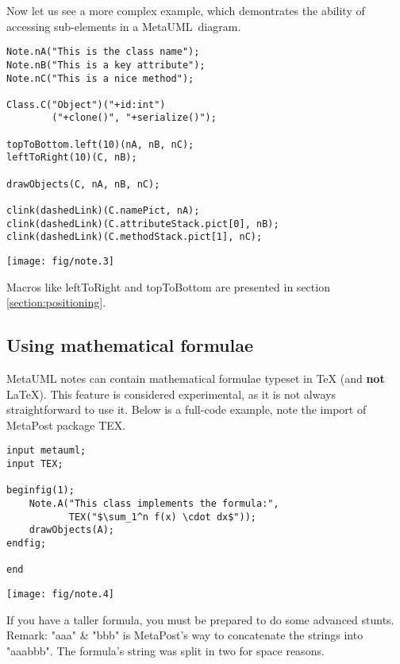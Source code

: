 \documentclass{article}
\newcommand{\code}{\ttfamily}
\newcommand{\metauml}{MetaUML}
\begin{document}
Now let us see a more complex example, which demontrates the ability of accessing sub-elements in a \metauml\ diagram.
\pagebreak

\begin{multicols}{2}
\begin{verbatim}
Note.nA("This is the class name");
Note.nB("This is a key attribute");
Note.nC("This is a nice method");

Class.C("Object")("+id:int")
        ("+clone()", "+serialize()");

topToBottom.left(10)(nA, nB, nC);
leftToRight(10)(C, nB);

drawObjects(C, nA, nB, nC);

clink(dashedLink)(C.namePict, nA); 
clink(dashedLink)(C.attributeStack.pict[0], nB); 
clink(dashedLink)(C.methodStack.pict[1], nC);
\end{verbatim}
\columnbreak
\hspace{1cm}\texttt{[image: fig/note.3]}
\end{multicols}

Macros like {\code leftToRight} and {\code topToBottom} are presented in section \ref{section:positioning}.

\subsection{Using mathematical formulae}

MetaUML notes can contain mathematical formulae typeset in TeX (and {\bf not} LaTeX). This feature is considered experimental, as it is not always straightforward to use it. Below is a full-code example, note the import of MetaPost package {\code TEX}.

\begin{multicols}{2}
\begin{verbatim}
input metauml;
input TEX;

beginfig(1);
    Note.A("This class implements the formula:", 
           TEX("$\sum_1^n f(x) \cdot dx$"));
    drawObjects(A);
endfig;

end
\end{verbatim}
\columnbreak
\hspace{0.5cm}\texttt{[image: fig/note.4]}
\end{multicols}

If you have a taller formula, you must be prepared to do some advanced stunts. Remark: {\code "aaa" \& "bbb"} is MetaPost's way to concatenate the strings into {\code "aaabbb"}. The formula's string was split in two for space reasons.
\end{document}
